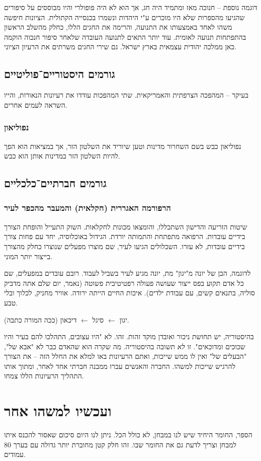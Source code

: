 \documentclass[]{article}
\begin{document}
	דוגמה נוספת – חנוכה מאז ומתמיד היה חג, אך הוא לא היה פופולרי והיו מבוססים על סיפורים שהגיעו מהספרות שלא היו מוכרים ע"י היהדות ונשמרו בכנסייה הקתולית. הציונות חיפשה משהו לאחד באמצעותו את התנועה, והרימה את החגים הללו, כחלק מהשלב הראשון בהתפתחות תנועה לאומית. עוד יותר התאים לתנועה העובדה שלאחר סיפור חנכוה הוקמה כאן ממלכה יהודית עצמאית בארץ ישראל. גם שירי החגים משרתים את הרעיון הציוני. 
	
	\subsection{גורמים היסטוריים־פוליטיים}
	בעיקר – המהפכה הצרפתית והאמריקאית. שתי המהפכות עודדו את רעיונות הנאורות, והייו השראה לעמים אחרים. 
	\subsubsection{נפוליאון}
	נפוליאון כבש בשם השחרור מדינות וטען שיוריד את השלטון הזר, אך במציאות הוא הפך להיות השלטון הזר במדינות אותן הוא כבש. 
	\subsection{גורמים חברתיים־כלכליים}
	\subsubsection{הרפורמה האגררית (חקלאית) והמעבר מהכפר לעיר}
	שיטות הזריעה והדישון השתכללו, והומצאו מכונות לחקלאות. השוק התעייל והופחת הצורך בידיים עובדות. הרפואה מתפתחת והתמותה יורדת. הגידול באוכלוסיה, יחד עם פחות צורך בידיים עובדות, לא עזרו. השכלולים הגיעו לעיר, שם מוצרו מפעלים שנוצרו כחלק מהצורך בייצור יותר המוני. 
	
	לדוגמה, הבן של יונה מ"יגון" מת, יונה מגיע לעיר בשביל לעבוד. רובם עובדים במפעלים, שם כל אדם תקוע בפס ייצור שעושה פעולה רפטיטיבית פשוטה (נאמר, יום שלם אתה מדביק סוליה, בתנאים קשים, עם עבודת ילדים). איכות החיים הייתה ירודה. אוויר מחניק, לכלוך ובלי טבע. 
	
	יגון $\leftarrow$ סיגל $\leftarrow$ דיכאון (ככה המורה כתבה). 
	
	בהיסטוריה, יש תחושת ניכור ואובדן מוקד זהות. זהו. לא "היו עצובים, התהלכו להם בעיר והיו שכוכים ומדוכאים". זו \textit{לא} תשובה בהיסטוריה. מה שקרה הוא שהאדם כבר לא "אבא של", "הבעלים של" ואין לו ממש שייכות, ואתם הרעיונות באו למלא את החלל הזה – את הצורך להרגיש שייכות למשהו. החברה והאנשים עברו ממבנה חברתי אחד לאחר, ומתוך אותו התהליך הרעיונות הללו צמחו. 
	
	\section{ועכשיו למשהו אחר}
	הספר, החומר היחיד שיש לנו במבחן, לא כולל הכל. ניתן לנו היום סיכום שאסור להכנס איתו למבחן וצריך לדעת גם את החומר שבו. זהו חלק קטן מחוברת יותר גדולה עם בערך 80 עמודים. 
	
\end{document}
